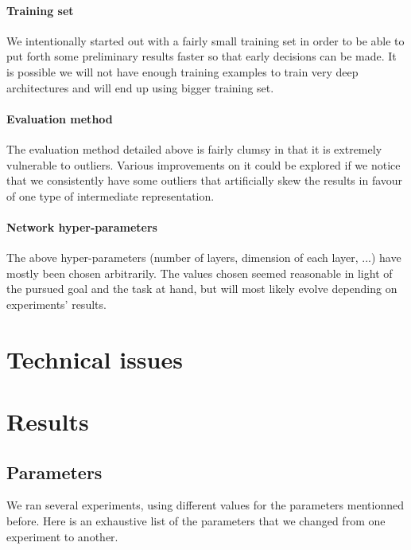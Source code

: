 \documentclass[conference]{IEEEtran}
\begin{document}
\paragraph{Training set}

We intentionally started out with a fairly small training set in order to be
able to put forth some preliminary results faster so that early decisions can be
made. It is possible we will not have enough training examples to train very
deep architectures and will end up using bigger training set.

\paragraph{Evaluation method}

The evaluation method detailed above is fairly clumsy in that it is extremely
vulnerable to outliers. Various improvements on it could be explored if we
notice that we consistently have some outliers that artificially skew the
results in favour of one type of intermediate representation.

\paragraph{Network hyper-parameters}

The above hyper-parameters (number of layers, dimension of each layer, ...) have
mostly been chosen arbitrarily. The values chosen seemed reasonable in light of
the pursued goal and the task at hand, but will most likely evolve depending on
experiments' results.


\section{Technical issues}

\section{Results}

\subsection{Parameters}

We ran several experiments, using different values for the parameters mentionned before.
Here is an exhaustive list of the parameters that we changed from one experiment to another.
\end{document}
